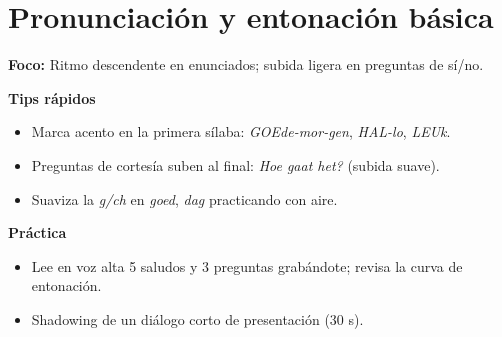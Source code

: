 \section{Pronunciación y entonación básica}
\textbf{Foco:} Ritmo descendente en enunciados; subida ligera en preguntas de sí/no.

\textbf{Tips rápidos}
\begin{itemize}[leftmargin=*]
  \item Marca acento en la primera sílaba: \textit{GOEde-mor-gen}, \textit{HAL-lo}, \textit{LEUk}.
  \item Preguntas de cortesía suben al final: \textit{Hoe gaat het?} (subida suave).
  \item Suaviza la \textit{g/ch} en \textit{goed}, \textit{dag} practicando con aire.
\end{itemize}

\textbf{Práctica}
\begin{itemize}[leftmargin=*]
  \item Lee en voz alta 5 saludos y 3 preguntas grabándote; revisa la curva de entonación.
  \item Shadowing de un diálogo corto de presentación (30 s).
\end{itemize}

